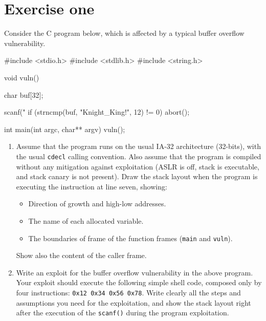 \section{Exercise one}

Consider the C program below, which is affected by a typical buffer overflow vulnerability.
\begin{verbnobox}[\verbarg]
#include <stdio.h>
#include <stdlib.h>
#include <string.h>

void vuln() {
    char buf[32];

    scanf("%
    if (strncmp(buf, "Knight_King!", 12) != 0) {
        abort();
    }
}

int main(int argc, char** argv) {
    vuln();
}
\end{verbnobox}
\begin{enumerate}
    \item Assume that the program runs on the usual IA-32 architecture (32-bits), with the usual \texttt{cdecl} calling convention. 
        Also assume that the program is compiled without any mitigation against exploitation (ASLR is off, stack is executable, and stack canary is not present).
        Draw the stack layout when the program is executing the instruction at line seven, showing:
        \begin{itemize}
            \item Direction of growth and high-low addresses.
            \item The name of each allocated variable.
            \item The boundaries of frame of the function frames (\texttt{main} and \texttt{vuln}).
        \end{itemize}
        Show also the content of the caller frame.
    \item Write an exploit for the buffer overflow vulnerability in the above program. 
        Your exploit should execute the following simple shell code, composed only by four instructions: \texttt{0x12 0x34 0x56 0x78}.
        Write clearly all the steps and assumptions you need for the exploitation, and show the stack layout right after the execution of the \texttt{scanf()} during the program exploitation.
\end{enumerate}

